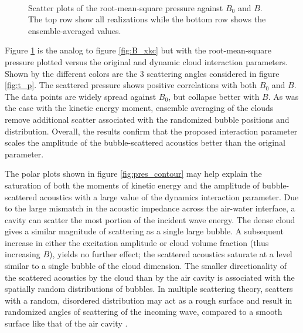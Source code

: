 \documentclass{jfm}
\begin{document}
\begin{figure}
  \center
  \\
  \caption{Scatter plots of the root-mean-square pressure against $B_0$ and $B$. The top row show all realizations while the bottom row shows the ensemble-averaged values.
   }
   \label{fig:B_prms} 
\end{figure}
Figure \ref{fig:B_prms} is the analog to figure \ref{fig:B_xkc} but with the root-mean-square pressure plotted versus the original and dynamic cloud interaction parameters.  Shown by the different colors are the 3 scattering angles considered in figure \ref{fig:t_p}.
The scattered pressure shows positive correlations with both $B_0$ and $B$.
The data points are widely spread against $B_0$, but collapse better with $B$.
As was the case with the kinetic energy moment, ensemble averaging of the clouds remove additional scatter associated with the randomized bubble positions and distribution.
Overall, the results confirm that the proposed interaction parameter scales the amplitude of the bubble-scattered acoustics better than the original parameter.

The polar plots shown in figure \ref{fig:pres_contour} may help explain the saturation of both the moments of kinetic energy and the amplitude of bubble-scattered acoustics with a large value of the dynamics interaction parameter.
Due to the large mismatch in the acoustic impedance across the air-water interface, a cavity can scatter the most portion of the incident wave energy.
The dense cloud gives a similar magnitude of scattering as a single large bubble.
A subsequent increase in either the excitation amplitude or cloud volume fraction (thus increasing $B$), yields no further effect; the scattered acoustics saturate at a level similar to a single bubble of the cloud dimension.
The smaller directionality of the scattered acoustics by the cloud than by the air cavity is associated with the spatially random distributions of bubbles.
In multiple scattering theory, scatters with a random, disordered distribution may act as a rough surface and result in randomized angles of scattering of the incoming wave, compared to a smooth surface like that of the air cavity \citep{Ishimaru78}.
\end{document}
